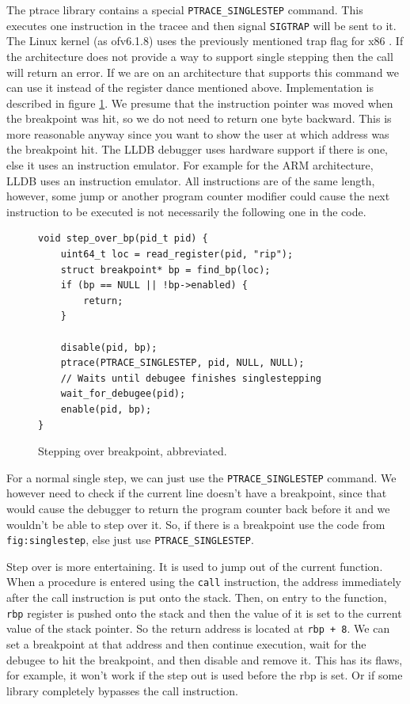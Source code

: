 The ptrace library contains a special \texttt{PTRACE\_SINGLESTEP} command. This
executes one instruction in the tracee and then signal \texttt{SIGTRAP} will be
sent to it. The Linux kernel (as ofv6.1.8) uses the previously mentioned trap
flag for x86 \cite{linuxkernel-trapflag}. If the architecture does not provide
a way to support single stepping then the call will return an error. If we are
on an architecture that supports this command we can use it instead of the
register dance mentioned above. Implementation is described in figure
\ref{fig:singlestep}. We presume that the instruction pointer was moved when
the breakpoint was hit, so we do not need to return one byte backward. This is
more reasonable anyway since you want to show the user at which address was the
breakpoint hit. The LLDB \cite{lldb} debugger uses hardware support if there is
one, else it uses an instruction emulator. For example for the ARM
architecture, LLDB uses an instruction emulator. All instructions are of the
same length, however, some jump or another program counter modifier could cause
the next instruction to be executed is not necessarily the following one in the
code.

\begin{figure}\label{fig:singlestep}
    \begin{verbatim}
void step_over_bp(pid_t pid) {
    uint64_t loc = read_register(pid, "rip");
    struct breakpoint* bp = find_bp(loc);
    if (bp == NULL || !bp->enabled) {
        return;
    }

    disable(pid, bp);
    ptrace(PTRACE_SINGLESTEP, pid, NULL, NULL);
    // Waits until debugee finishes singlestepping
    wait_for_debugee(pid);
    enable(pid, bp);
}
    \end{verbatim}
    \caption{Stepping over breakpoint, abbreviated.}
\end{figure}

For a normal single step, we can just use the \texttt{PTRACE\_SINGLESTEP}
command. We however need to check if the current line doesn't have a
breakpoint, since that would cause the debugger to return the program counter
back before it and we wouldn't be able to step over it. So, if there is a
breakpoint use the code from \texttt{fig:singlestep}, else just use
\texttt{PTRACE\_SINGLESTEP}.

Step over is more entertaining. It is used to jump out of the current function.
When a procedure is entered using the \texttt{call} instruction, the address
immediately after the call instruction is put onto the stack. Then, on entry to
the function, \texttt{rbp} register is pushed onto the stack and then the value
of it is set to the current value of the stack pointer. So the return address
is located at \texttt{rbp + 8}. We can set a breakpoint at that address and
then continue execution, wait for the debugee to hit the breakpoint, and then
disable and remove it. This has its flaws, for example, it won't work if the
step out is used before the rbp is set. Or if some library completely bypasses
the call instruction.

